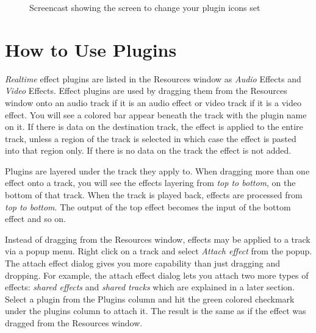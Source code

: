 \begin{figure}[htpb]
    \centering
    \caption{Screencast showing the screen to change your plugin icons set}
    \label{fig:plugin-icons}
\end{figure}

\section{How to Use Plugins}%
\label{sec:how_use_plugins}

\textit{Realtime} effect plugins are listed in the Resources window as \textit{Audio} Effects and \textit{Video} Effects. Effect plugins are used by dragging them from the Resources window onto an audio track if it is an audio effect or video track if it is a video effect. You will see a colored bar appear beneath the track with the plugin name on it. If there is data on the destination track, the effect is applied to the entire track, unless a region of the track is selected in which case the effect is pasted into that region only. If there is no data on the track the effect is not added.

Plugins are layered under the track they apply to. When dragging more than one effect onto a track, you will see the effects layering from \textit{top to bottom}, on the bottom of that track. When the track is played back, effects are processed from \textit{top to bottom}. The output of the top effect becomes the input of the bottom effect and so on.

Instead of dragging from the Resources window, effects may be applied to a track via a popup menu. Right click on a track and select \textit{Attach effect} from the popup. The attach effect dialog gives you more capability than just dragging and dropping. For example, the attach effect dialog lets you attach two more types of effects: \textit{shared effects} and \textit{shared tracks} which are explained in a later section. Select a plugin from the Plugins column and hit the green colored checkmark under the plugins column to attach it. The result is the same as if the effect was dragged from the Resources window.

